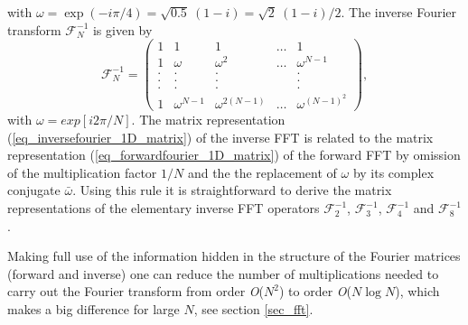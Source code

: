 with 
$\omega = \exp(-i \pi /4) = \sqrt{0.5} \ (1 - i) = 
 \sqrt{2} \ (1 - i)/2$. 
The inverse Fourier transform $\mathcal{F}^{-1}_{N}$ is given by 
\begin{equation} \label{eq_inversefourier_1D_matrix}
 \mathcal{F}^{-1}_{N}
  =
 \left(
  \begin{array}{ccccc}
    1 &    1         &     1           & \dots & 1
   \\
    1 & \omega       & \omega^{2}      & \dots & \omega^{N-1}
   \\
    . &    .         &     .           &       & . 
   \\
    . &    .         &     .           &       & .
   \\
    . &    .         &     .           &       & .
   \\
    1 & \omega^{N-1} & \omega^{2(N-1)} & \dots & \omega^{(N-1)^{2}}
  \end{array}
 \right), 
\end{equation}
with $\omega = exp \left[i 2 \pi / N   \right]$. The matrix
representation (\ref{eq_inversefourier_1D_matrix}) of the inverse
FFT is related to the matrix representation 
(\ref{eq_forwardfourier_1D_matrix}) of the forward FFT by
omission of the multiplication factor $1/N$ and the
the replacement of $\omega$ by its complex conjugate 
$\bar{\omega}$. Using this rule it is straightforward to derive
the matrix representations of the elementary inverse FFT
operators $\mathcal{F}^{-1}_{2}$, $\mathcal{F}^{-1}_{3}$, 
$\mathcal{F}^{-1}_{4}$ and $\mathcal{F}^{-1}_{8}$.

Making full use of the information hidden in the structure of the 
Fourier matrices (forward and inverse) one can reduce the number 
of multiplications needed to carry out the Fourier transform from 
order {\it O}($N^2$) to order {\it O}($N \log N$), which makes a
big difference for large $N$, see section \ref{sec_fft}.
%
